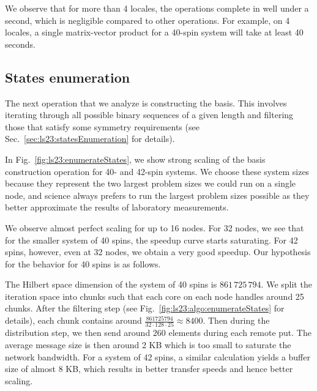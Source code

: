 We observe that for more than 4 locales, the operations complete in well under a second, which is negligible compared to other operations. For example, on 4 locales, a single matrix-vector product for a 40-spin system will take at least 40 seconds.

\subsection{States enumeration}


The next operation that we analyze is constructing the basis. This involves iterating through all possible binary sequences of a given length and filtering those that satisfy some symmetry requirements (see Sec.~\ref{sec:ls23:statesEnumeration} for details).

In Fig.~\ref{fig:ls23:enumerateStates}, we show strong scaling of the basis construction operation for 40- and 42-spin systems. We choose these system sizes because they represent the two largest problem sizes we could run on a single node, and science always prefers to run the largest problem sizes possible as they better approximate the results of laboratory measurements.

We observe almost perfect scaling for up to 16 nodes. For 32 nodes, we see that for the smaller system of 40 spins, the speedup curve starts saturating. For 42 spins, however, even at 32 nodes, we obtain a very good speedup. Our hypothesis for the behavior for 40 spins is as follows.

The Hilbert space dimension of the system of 40 spins is $861\,725\,794$. We split the iteration space into chunks such that each core on each node handles around 25 chunks. After the filtering step (see Fig.~\ref{fig:ls23:algo:enumerateStates} for details), each chunk contains around $\frac{861725794}{32 \cdot 128 \cdot 25} \approx 8400$. Then during the distribution step, we then send around $260$ elements during each remote put. The average message size is then around 2 KB which is too small to saturate the network bandwidth. For a system of 42 spins, a similar calculation yields a buffer size of almost 8 KB, which results in better transfer speeds and hence better scaling.

